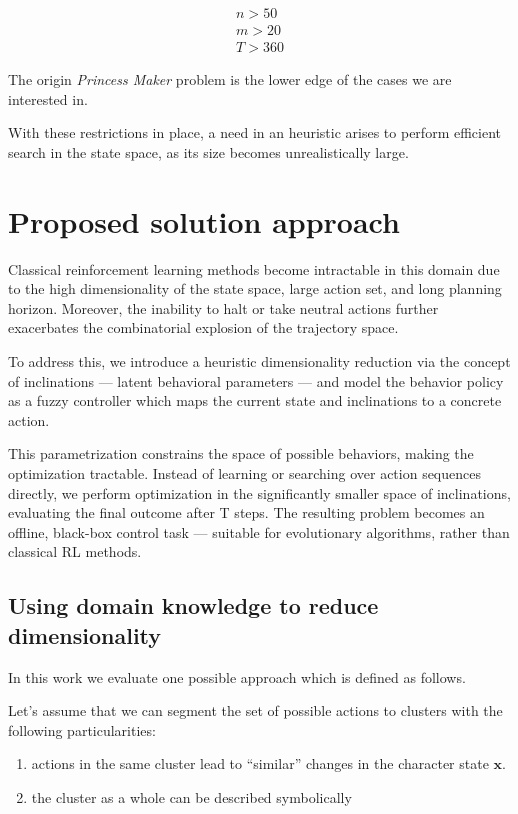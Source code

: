 \documentclass[11pt, a4paper]{article}
\begin{document}
	\begin{eqnarray}
		n > 50 \\
		m > 20 \\
		T > 360
	\end{eqnarray}
	
	The origin \textit{Princess Maker} problem is the lower edge of the cases we are interested in.

	With these restrictions in place, a need in an heuristic arises to perform efficient search in the state space, as its size becomes unrealistically large.
	
	\section{Proposed solution approach}

Classical reinforcement learning methods become intractable in this domain due to the high dimensionality of the state space, large action set, and long planning horizon. Moreover, the inability to halt or take neutral actions further exacerbates the combinatorial explosion of the trajectory space.

To address this, we introduce a heuristic dimensionality reduction via the concept of inclinations — latent behavioral parameters — and model the behavior policy as a fuzzy controller which maps the current state and inclinations to a concrete action.

This parametrization constrains the space of possible behaviors, making the optimization tractable. Instead of learning or searching over action sequences directly, we perform optimization in the significantly smaller space of inclinations, evaluating the final outcome after T steps. The resulting problem becomes an offline, black-box control task — suitable for evolutionary algorithms, rather than classical RL methods.


	\subsection{Using domain knowledge to reduce dimensionality}

	In this work we evaluate one possible approach which is defined as follows.
	
	Let's assume that we can segment the set of possible actions to clusters with the following particularities:
	
	\begin{enumerate}
		\item actions in the same cluster lead to ``similar'' changes in the character state $\mathbf{x}$.
		\item the cluster as a whole can be described symbolically
	\end{enumerate}
	
\end{document}
